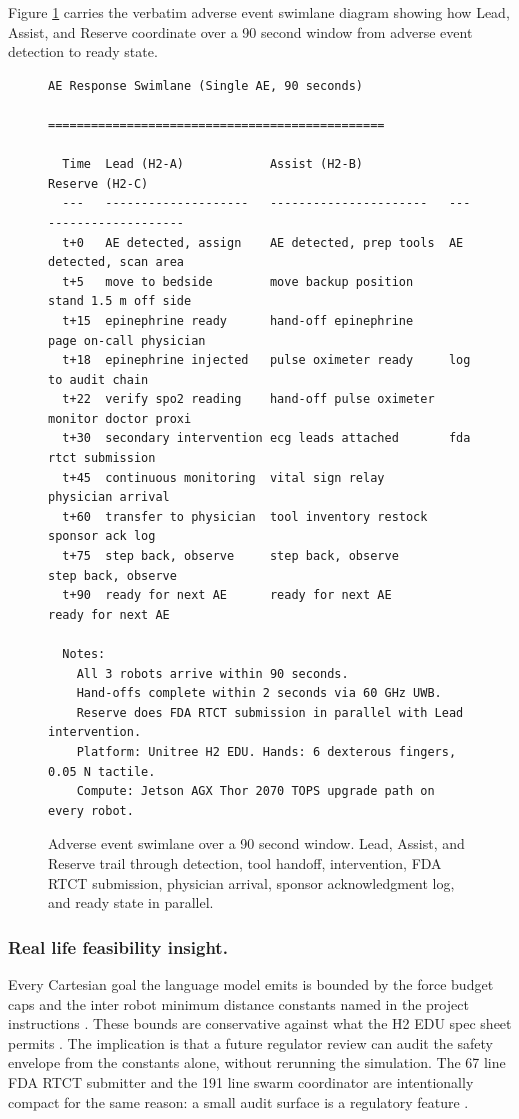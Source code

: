 \begin{sectionaccent}
Figure \ref{fig:ae-response-flow} carries the verbatim adverse event
swimlane diagram showing how Lead, Assist, and Reserve coordinate
over a 90 second window from adverse event detection to ready state.

\begin{figure}[H]
\centering
\begin{Verbatim}[fontsize=\footnotesize]
                       AE Response Swimlane (Single AE, 90 seconds)
                       ===============================================

  Time  Lead (H2-A)            Assist (H2-B)            Reserve (H2-C)
  ---   --------------------   ----------------------   ----------------------
  t+0   AE detected, assign    AE detected, prep tools  AE detected, scan area
  t+5   move to bedside        move backup position     stand 1.5 m off side
  t+15  epinephrine ready      hand-off epinephrine     page on-call physician
  t+18  epinephrine injected   pulse oximeter ready     log to audit chain
  t+22  verify spo2 reading    hand-off pulse oximeter  monitor doctor proxi
  t+30  secondary intervention ecg leads attached       fda rtct submission
  t+45  continuous monitoring  vital sign relay         physician arrival
  t+60  transfer to physician  tool inventory restock   sponsor ack log
  t+75  step back, observe     step back, observe       step back, observe
  t+90  ready for next AE      ready for next AE        ready for next AE

  Notes:
    All 3 robots arrive within 90 seconds.
    Hand-offs complete within 2 seconds via 60 GHz UWB.
    Reserve does FDA RTCT submission in parallel with Lead intervention.
    Platform: Unitree H2 EDU. Hands: 6 dexterous fingers, 0.05 N tactile.
    Compute: Jetson AGX Thor 2070 TOPS upgrade path on every robot.
\end{Verbatim}
\caption{Adverse event swimlane over a 90 second window. Lead, Assist, and Reserve trail through detection, tool handoff, intervention, FDA RTCT submission, physician arrival, sponsor acknowledgment log, and ready state in parallel.}
\label{fig:ae-response-flow}
\end{figure}

\subsubsection*{Real life feasibility insight.} Every Cartesian goal
the language model emits is bounded by the force budget caps and the
inter robot minimum distance constants named in the project
instructions \cite{kawchak_2026_humanoid_instructions}. These bounds
are conservative against what the H2 EDU spec sheet permits
\cite{unitree_h2_2026}. The implication is that a future regulator
review can audit the safety envelope from the constants alone,
without rerunning the simulation. The 67 line FDA RTCT submitter and
the 191 line swarm coordinator are intentionally compact for the
same reason: a small audit surface is a regulatory feature
\cite{iec_62304}.


\end{sectionaccent}
